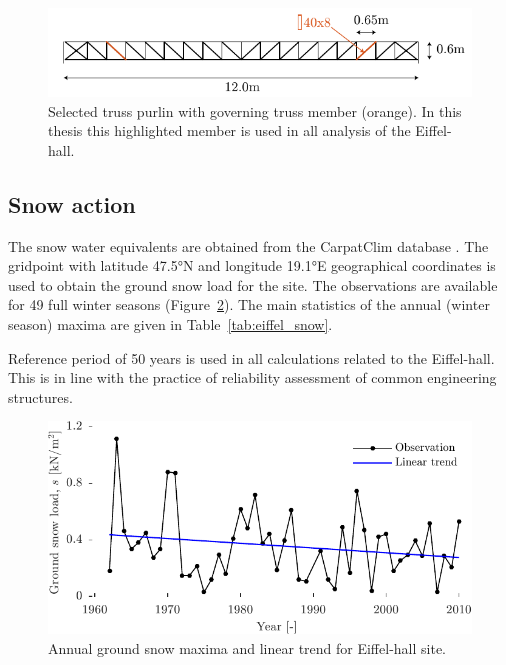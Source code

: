 \begin{figure}[htbp!] 
	\centering    
	\includegraphics[]{selected_purlin.pdf}
	\caption{Selected truss purlin with governing truss member (orange). In this thesis this highlighted member is used in all analysis of the Eiffel-hall.}
	\label{fig:selected_purlin}
\end{figure}

\subsection{Snow action}
The snow water equivalents are obtained from the CarpatClim database \citep{Szalai2013}. The gridpoint with latitude 47.5°N and longitude 19.1°E geographical coordinates is used to obtain the ground snow load for the site. The observations are available for 49 full winter seasons (Figure~\ref{fig:amax_year_eiffel}). The main statistics of the annual (winter season) maxima are given in Table~\ref{tab:eiffel_snow}.

Reference period of 50 years is used in all calculations related to the Eiffel-hall. This is in line with the practice of reliability assessment of common engineering structures.

\begin{figure}[htbp!] 
	\centering    
	\includegraphics[]{amax_year_eiffel.pdf}
	\caption{Annual ground snow maxima and linear trend for Eiffel-hall site.}
	\label{fig:amax_year_eiffel}
\end{figure}

